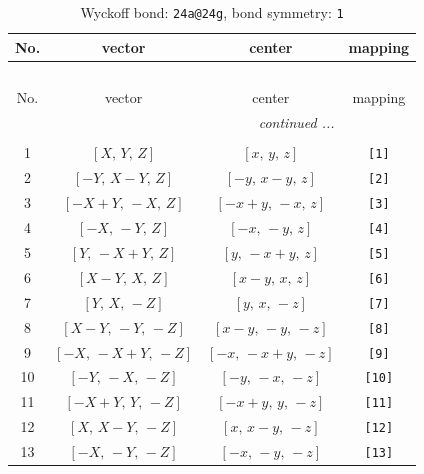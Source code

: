 \documentclass[fleqn,8pt]{jsarticle}
\begin{document}
\begin{longtable}{cccc}
\caption{Wyckoff bond: {\tt 24a@24g}, bond symmetry: {\tt 1}}
 \\
 \hline \hline
No. & vector & center & mapping \\ \hline \endfirsthead

\multicolumn{3}{l}{\tablename\ \thetable{}} \\
 \hline \hline
No. & vector & center & mapping \\ \hline \endhead

 \hline \hline
\multicolumn{3}{r}{\footnotesize\it continued ...} \\ \endfoot

 \hline \hline
\multicolumn{3}{r}{} \\ \endlastfoot

1 & $\left[ X,\, Y,\, Z \right]$ & $\left[ x,\, y,\, z \right]$ & {\tt [1]} \\ \hline
2 & $\left[ - Y,\, X - Y,\, Z \right]$ & $\left[ - y,\, x - y,\, z \right]$ & {\tt [2]} \\ \hline
3 & $\left[ - X + Y,\, - X,\, Z \right]$ & $\left[ - x + y,\, - x,\, z \right]$ & {\tt [3]} \\ \hline
4 & $\left[ - X,\, - Y,\, Z \right]$ & $\left[ - x,\, - y,\, z \right]$ & {\tt [4]} \\ \hline
5 & $\left[ Y,\, - X + Y,\, Z \right]$ & $\left[ y,\, - x + y,\, z \right]$ & {\tt [5]} \\ \hline
6 & $\left[ X - Y,\, X,\, Z \right]$ & $\left[ x - y,\, x,\, z \right]$ & {\tt [6]} \\ \hline
7 & $\left[ Y,\, X,\, - Z \right]$ & $\left[ y,\, x,\, - z \right]$ & {\tt [7]} \\ \hline
8 & $\left[ X - Y,\, - Y,\, - Z \right]$ & $\left[ x - y,\, - y,\, - z \right]$ & {\tt [8]} \\ \hline
9 & $\left[ - X,\, - X + Y,\, - Z \right]$ & $\left[ - x,\, - x + y,\, - z \right]$ & {\tt [9]} \\ \hline
10 & $\left[ - Y,\, - X,\, - Z \right]$ & $\left[ - y,\, - x,\, - z \right]$ & {\tt [10]} \\ \hline
11 & $\left[ - X + Y,\, Y,\, - Z \right]$ & $\left[ - x + y,\, y,\, - z \right]$ & {\tt [11]} \\ \hline
12 & $\left[ X,\, X - Y,\, - Z \right]$ & $\left[ x,\, x - y,\, - z \right]$ & {\tt [12]} \\ \hline
13 & $\left[ - X,\, - Y,\, - Z \right]$ & $\left[ - x,\, - y,\, - z \right]$ & {\tt [13]} \\ \hline

\end{longtable}
\end{document}
